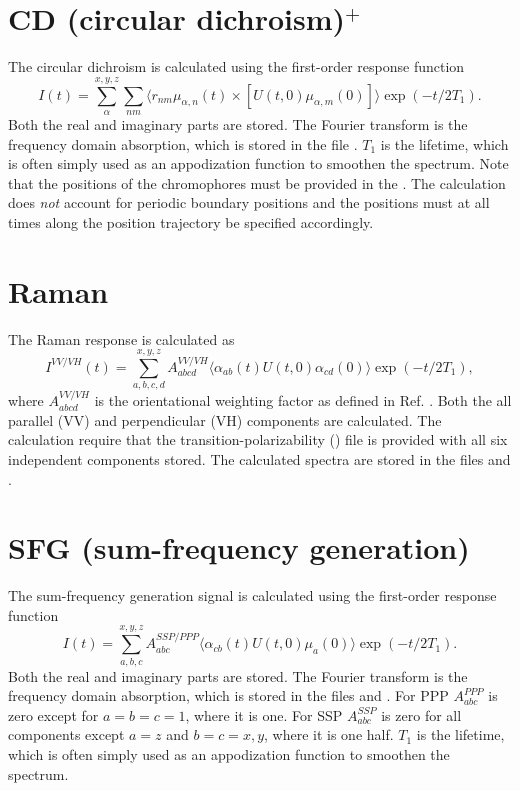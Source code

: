 \section{CD (circular dichroism)$^{+}$}
The circular dichroism is calculated using the first-order response function
\begin{equation}
	I(t)=\sum_{\alpha}^{x,y,z}\sum_{nm}\langle r_{nm}\mu_{\alpha,n}(t)\times[U(t,0)\mu_{\alpha,m}(0)]\rangle\exp(-t/2T_1).
\end{equation}
Both the real and imaginary parts are stored.
The Fourier transform is the frequency domain absorption, which is stored in the file
. $T_1$ is the lifetime, which is often simply used as an
appodization function to smoothen the spectrum. Note that the positions of the
chromophores must be provided in the . The calculation does
\textit{not} account for periodic boundary positions and the positions must at all
times along the position trajectory be specified accordingly.

\section{Raman}
The Raman response is calculated as \cite{Torii.2002.J.Phys.Chem.A.106.3281,Shi.2012.J.Phys.Chem.B.116.13821}
\begin{equation}
        I^{VV/VH}(t)=\sum_{a,b,c,d}^{x,y,z}A^{VV/VH}_{abcd}\langle\alpha_{ab}(t)U(t,0)\alpha_{cd}(0)\rangle\exp(-t/2T_1),
\end{equation}
where $A^{VV/VH}_{abcd}$ is the orientational weighting factor as defined in
Ref. . Both the all parallel (VV) and
perpendicular (VH) components are calculated. The calculation require that the
transition-polarizability () file is provided with all six independent
components stored. The calculated spectra are stored in the files 
and .

\section{SFG (sum-frequency generation)}
The sum-frequency generation signal is calculated using the first-order response
function \cite{Roy.2014.J.Chem.Phys..141.18C502}
\begin{equation}
		I(t)=\sum_{a,b,c}^{x,y,z}A^{SSP/PPP}_{abc}\langle\alpha_{cb}(t)U(t,0)\mu_{a}(0)\rangle\exp(-t/2T_1).
\end{equation}
Both the real and imaginary parts are stored.
The Fourier transform is the frequency domain absorption, which is stored in the files
 and . For PPP $A^{PPP}_{abc}$ is zero except for
$a=b=c=1$, where it is one. For SSP $A^{SSP}_{abc}$ is zero for all components except
$a=z$ and $b=c=x,y$, where it is one half. $T_1$ is the lifetime, which is often simply
used as an appodization function to smoothen the spectrum. 

